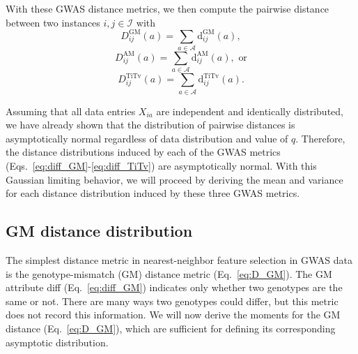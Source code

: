 \documentclass[aos]{imsart}
\begin{document}
With these GWAS distance metrics, we then compute the pairwise distance between two instances $i,j \in \mathcal{I}$ with
%
\begin{equation}\label{eq:D_GM}
D^\text{GM}_{ij}(a) = \sum_{a \in \mathcal{A}} \text{d}^\text{GM}_{ij}(a),
\end{equation}
%
\begin{equation}\label{eq:D_AM}
D^\text{AM}_{ij}(a) = \sum_{a \in \mathcal{A}} \text{d}^\text{AM}_{ij}(a), \text{ or}
\end{equation}
%
\begin{equation}\label{eq:D_TiTv}
D^\text{TiTv}_{ij}(a) = \sum_{a \in \mathcal{A}} \text{d}^\text{TiTv}_{ij}(a).
\end{equation}

Assuming that all data entries $X_{ia}$ are independent and identically distributed, we have already shown that the distribution of pairwise distances is asymptotically normal regardless of data distribution and value of $q$. Therefore, the distance distributions induced by each of the GWAS metrics (Eqs.~\ref{eq:diff_GM}-\ref{eq:diff_TiTv}) are asymptotically normal. With this Gaussian limiting behavior, we will proceed by deriving the mean and variance for each distance distribution induced by these three GWAS metrics. 

\subsection{GM distance distribution}

The simplest distance metric in nearest-neighbor feature selection in GWAS data is the genotype-mismatch (GM) distance metric (Eq.~\ref{eq:D_GM}). The GM attribute diff (Eq.~\ref{eq:diff_GM}) indicates only whether two genotypes are the same or not. There are many ways two genotypes could differ, but this metric does not record this information. We will now derive the moments for the GM distance (Eq.~\ref{eq:D_GM}), which are sufficient for defining its corresponding asymptotic distribution.
\end{document}
